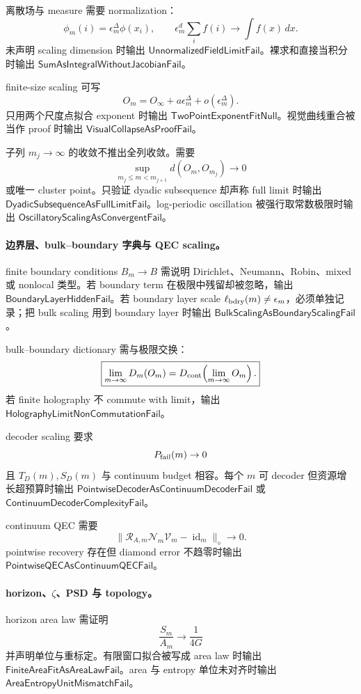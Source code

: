 离散场与 measure 需要 normalization：
\[
\phi_m(i)=\epsilon_m^\Delta\phi(x_i),
\qquad
\epsilon_m^d\sum_i f(i)\to\int f(x)\,dx.
\]
未声明 scaling dimension 时输出 \(\mathsf{UnnormalizedFieldLimitFail}\)。裸求和直接当积分时输出 \(\mathsf{SumAsIntegralWithoutJacobianFail}\)。

finite-size scaling 可写
\[
O_m=O_\infty+a\epsilon_m^\Delta+o(\epsilon_m^\Delta).
\]
只用两个尺度点拟合 exponent 时输出 \(\mathsf{TwoPointExponentFitNull}\)。视觉曲线重合被当作 proof 时输出 \(\mathsf{VisualCollapseAsProofFail}\)。

子列 \(m_j\to\infty\) 的收敛不推出全列收敛。需要
\[
\boxed{
\sup_{m_j\le m<m_{j+1}}d(O_m,O_{m_j})\to0
}
\]
或唯一 cluster point。只验证 dyadic subsequence 却声称 full limit 时输出 \(\mathsf{DyadicSubsequenceAsFullLimitFail}\)。log-periodic oscillation 被强行取常数极限时输出 \(\mathsf{OscillatoryScalingAsConvergentFail}\)。

\paragraph{边界层、bulk--boundary 字典与 QEC scaling。}
finite boundary conditions \(B_m\to B\) 需说明 Dirichlet、Neumann、Robin、mixed 或 nonlocal 类型。若 boundary term 在极限中残留却被忽略，输出 \(\mathsf{BoundaryLayerHiddenFail}\)。若 boundary layer scale \(\ell_{\rm bdry}(m)\ne\epsilon_m\)，必须单独记录；把 bulk scaling 用到 boundary layer 时输出 \(\mathsf{BulkScalingAsBoundaryScalingFail}\)。

bulk--boundary dictionary 需与极限交换：
\[
\boxed{
\lim_{m\to\infty}D_m(O_m)
=
D_{\rm cont}\!\left(\lim_{m\to\infty}O_m\right).
}
\]
若 finite holography 不 commute with limit，输出 \(\mathsf{HolographyLimitNonCommutationFail}\)。

decoder scaling 要求
\[
P_{\rm fail}(m)\to0
\]
且 \(T_D(m),S_D(m)\) 与 continuum budget 相容。每个 \(m\) 可 decoder 但资源增长超预算时输出 \(\mathsf{PointwiseDecoderAsContinuumDecoderFail}\) 或 \(\mathsf{ContinuumDecoderComplexityFail}\)。

continuum QEC 需要
\[
\|\mathcal R_{A,m}\mathcal N_m\mathcal V_m-\operatorname{id}_m\|_\diamond\to0.
\]
pointwise recovery 存在但 diamond error 不趋零时输出 \(\mathsf{PointwiseQECAsContinuumQECFail}\)。

\paragraph{horizon、\(\zeta\)、PSD 与 topology。}
horizon area law 需证明
\[
\frac{S_m}{A_m}\to\frac1{4G}
\]
并声明单位与重标定。有限窗口拟合被写成 area law 时输出 \(\mathsf{FiniteAreaFitAsAreaLawFail}\)。area 与 entropy 单位未对齐时输出 \(\mathsf{AreaEntropyUnitMismatchFail}\)。

